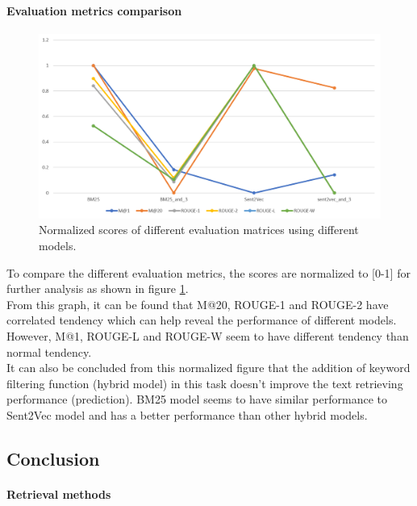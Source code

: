 \paragraph{Evaluation metrics comparison}

\begin{figure}
	\centering
	\includegraphics[width=0.9\linewidth]{figure/partA_normalized_evaluation_metrics}
	\caption{Normalized scores of different evaluation matrices using different models.}
	\label{fig: partanormalizedevaluationmetrics}
\end{figure}

To compare the different evaluation metrics, the scores are normalized to [0-1] for further analysis as shown in figure \ref{fig: partanormalizedevaluationmetrics}.\\

From this graph, it can be found that M@20, ROUGE-1 and ROUGE-2 have correlated tendency which can help reveal the performance of different models. However, M@1, ROUGE-L and ROUGE-W seem to have different tendency than normal tendency.\\

It can also be concluded from this normalized figure that the addition of keyword filtering function (hybrid model) in this task doesn't improve the text retrieving performance (prediction). BM25 model seems to have similar performance to Sent2Vec model and has a better performance than other hybrid models.


\subsection{Conclusion}	

\paragraph{Retrieval methods}

